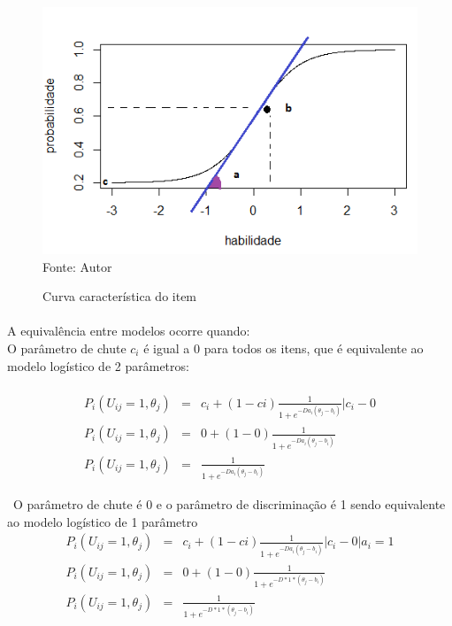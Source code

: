 	\paragraph{}
	\begin{figure}[!h]
	    \centering
	    \caption{Curva característica do item}
	    \includegraphics[width=0.48\linewidth]{img/Rplo2}\\
	    Fonte: Autor
	    \label{fig:Rplo2}
	\end{figure}
	\paragraph{}
    	\noindent A equivalência entre modelos ocorre quando:\\
    	O parâmetro de chute $c_i$ é igual a $0$ para todos os itens, que é equivalente ao modelo logístico de 2 parâmetros:
    \paragraph{}
	\begin{eqnarray}
		P_i(U_{ij} = 1,\theta_j) & = & c_i + (1-ci)\displaystyle\frac{1}{1 + e^{-Da_i(\theta_j - b_i)}} | c_i - 0 \nonumber \\ 
		P_i(U_{ij} = 1,\theta_j) & = & 0 + (1-0)\displaystyle\frac{1}{1 + e^{-Da_i(\theta_j - b_i)}} \nonumber \\
		P_i(U_{ij} = 1,\theta_j) & = & \displaystyle\frac{1}{1 + e^{-Da_i(\theta_j - b_i)}} \nonumber
	\end{eqnarray}
    	
    	\
    \noindent O parâmetro de chute é 0 e o parâmetro de discriminação é 1 sendo equivalente ao modelo logístico de 1 parâmetro\\
	
	\begin{eqnarray}
		P_i(U_{ij} = 1,\theta_j) & = & c_i + (1-ci)\displaystyle\frac{1}{1 + e^{-Da_i(\theta_j - b_i)}} | c_i - 0 | a_i = 1\\
		P_i(U_{ij} = 1,\theta_j) & = & 0 + (1-0)\displaystyle\frac{1}{1 + e^{-D*1*(\theta_j - b_i)}} \\
		P_i(U_{ij} = 1,\theta_j) & = & \displaystyle\frac{1}{1 + e^{-D*1*(\theta_j - b_i)}}
	\end{eqnarray}
    	
